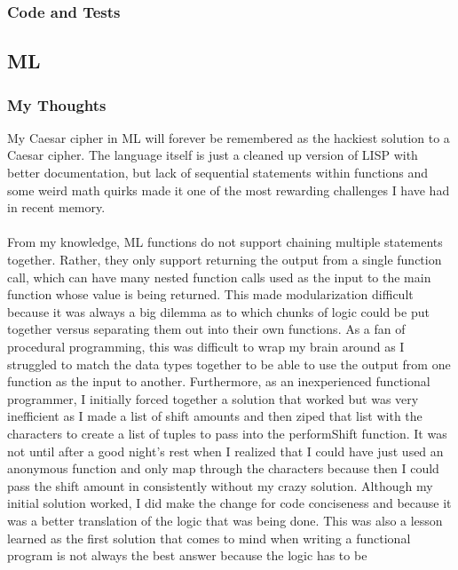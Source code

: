 \documentclass[letterpaper, 10pt, DIV=13]{scrartcl}
\numberwithin{equation}{section}
\numberwithin{figure}{section}
\numberwithin{table}{section}
\begin{document}
\subsubsection{Code and Tests}



\subsection{ML}
\subsubsection{My Thoughts}
My Caesar cipher in ML will forever be remembered as the hackiest solution to a Caesar cipher. The language itself is just a cleaned up version of LISP with better
documentation, but lack of sequential statements within functions and some weird math quirks made it one of the most rewarding challenges I have had in recent memory.
\\ \\
From my knowledge, ML functions do not support chaining multiple statements together. Rather, they only support returning the output from a single function call,
which can have many nested function calls used as the input to the main function whose value is being returned. This made modularization difficult because it was
always a big dilemma as to which chunks of logic could be put together versus separating them out into their own functions. As a fan of procedural programming,
this was difficult to wrap my brain around as I struggled to match the data types together to be able to use the output from one function as the input to another.
Furthermore, as an inexperienced functional programmer, I initially forced together a solution that worked but was very inefficient as I made a list of shift amounts
and then ziped that list with the characters to create a list of tuples to pass into the performShift function. It was not until after a good night's rest when I realized
that I could have just used an anonymous function and only map through the characters because then I could pass the shift amount in consistently without my crazy 
solution. Although my initial solution worked, I did make the change for code conciseness and because it was a better translation of the logic that was being done.
This was also a lesson learned as the first solution that comes to mind when writing a functional program is not always the best answer because the logic has to be
\end{document}
